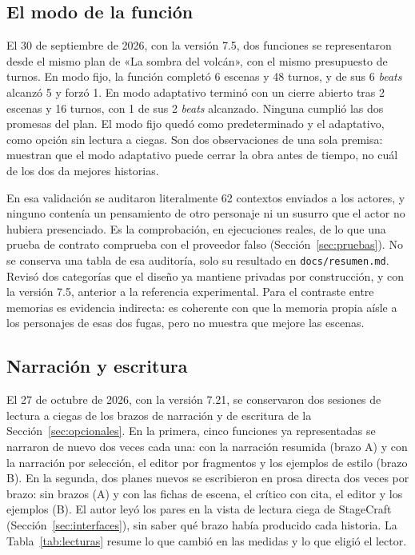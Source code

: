 \subsection{El modo de la función}\label{sec:val-modo}

El 30 de septiembre de 2026, con la versión 7.5, dos funciones se representaron desde el mismo plan
de «La sombra del volcán», con el mismo presupuesto de turnos. En modo fijo, la función completó 6
escenas y 48 turnos, y de sus 6 \textit{beats} alcanzó 5 y forzó 1. En modo adaptativo terminó con un
cierre abierto tras 2 escenas y 16 turnos, con 1 de sus 2 \textit{beats} alcanzado. Ninguna cumplió
las dos promesas del plan. El modo fijo quedó como predeterminado y el adaptativo, como opción sin
lectura a ciegas. Son dos observaciones de una sola premisa: muestran que el modo adaptativo puede
cerrar la obra antes de tiempo, no cuál de los dos da mejores historias.

En esa validación se auditaron literalmente 62 contextos enviados a los actores, y ninguno contenía un
pensamiento de otro personaje ni un susurro que el actor no hubiera presenciado. Es la comprobación,
en ejecuciones reales, de lo que una prueba de contrato comprueba con el proveedor falso
(Sección~\ref{sec:pruebas}). No se conserva una tabla de esa auditoría, solo su resultado en
\texttt{docs/resumen.md}. Revisó dos categorías que el diseño ya mantiene privadas por construcción,
y con la versión 7.5, anterior a la referencia experimental. Para el contraste entre memorias es evidencia indirecta: es coherente con que la
memoria propia aísle a los personajes de esas dos fugas, pero no muestra que mejore las escenas.

\subsection{Narración y escritura}\label{sec:val-brazos}

El 27 de octubre de 2026, con la versión 7.21, se conservaron dos sesiones de lectura a ciegas de los brazos de
narración y de escritura de la Sección~\ref{sec:opcionales}. En la primera, cinco funciones ya
representadas se narraron de nuevo dos veces cada una: con la narración resumida (brazo A) y con la
narración por selección, el editor por fragmentos y los ejemplos de estilo (brazo B). En la segunda,
dos planes nuevos se escribieron en prosa directa dos veces por brazo: sin brazos (A) y con las
fichas de escena, el crítico con cita, el editor y los ejemplos (B). El autor leyó los pares en la
vista de lectura ciega de StageCraft (Sección~\ref{sec:interfaces}), sin saber qué brazo había
producido cada historia. La Tabla~\ref{tab:lecturas} resume lo que cambió en las medidas y lo que
eligió el lector.

